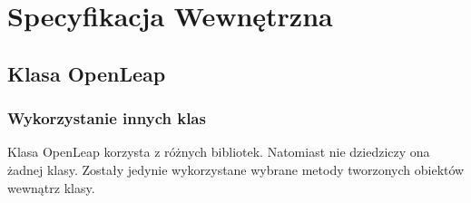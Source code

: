 \chapter{Specyfikacja Wewnętrzna}




\section{Klasa OpenLeap}

\subsection{Wykorzystanie innych klas}
\quad Klasa OpenLeap korzysta z różnych bibliotek. Natomiast nie dziedziczy ona żadnej klasy. Zostały jedynie wykorzystane wybrane metody tworzonych obiektów wewnątrz klasy. 



